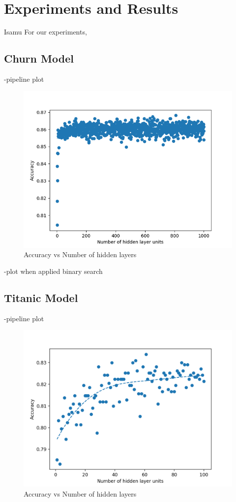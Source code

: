 \documentclass[runningheads]{llncs}
\begin{document}
\section{Experiments and Results}
Isamu
For our experiments,
\subsection{Churn Model}
-pipeline plot
\begin{figure}[H]
    \centering
    \includegraphics[width=0.8\linewidth]{figures/1000_iterations_churn.png}
    \setlength{\belowcaptionskip}{-15pt}
    \caption{Accuracy vs Number of hidden layers}
    \label{dnadigest}
\end{figure}

-plot when applied binary search 


\subsection{Titanic Model}
-pipeline plot

\begin{figure}[H]
    \centering
    \includegraphics[width=0.8\linewidth]{figures/drexelai_binary_search_train_acc_titanic.png}
    \setlength{\belowcaptionskip}{-15pt}
    \caption{Accuracy vs Number of hidden layers}
    \label{dnadigest}
\end{figure}
\end{document}
